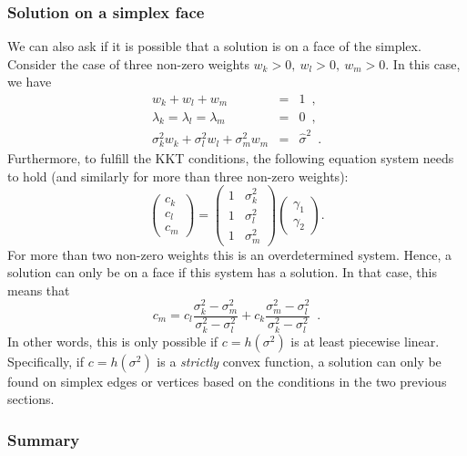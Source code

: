 \documentclass{article}
\numberwithin{equation}{section}
\begin{document}
\subsubsection{Solution on a simplex face}

We can also ask if it is possible that a solution is on a face of the simplex. Consider the case of three non-zero weights $w_k>0,~w_l>0,~w_m>0$. In this case, we have
\begin{eqnarray}
  w_k + w_l + w_m &=& 1\enspace,\\
  \lambda_k = \lambda_l = \lambda_m &=& 0\enspace,\\
  \sigma_k^2 w_k + \sigma_l^2 w_l + \sigma_m^2 w_m &=&\hat{\sigma}^2\enspace.
\end{eqnarray}
Furthermore, to fulfill the KKT conditions, the following equation system needs to hold (and similarly for more than three non-zero weights):
\begin{equation}
  \begin{pmatrix}
    c_k \\
    c_l \\
    c_m
  \end{pmatrix} =
  \begin{pmatrix}
    1 & \sigma_k^2 \\
    1 & \sigma_l^2 \\
    1 & \sigma_m^2 
  \end{pmatrix}
  \begin{pmatrix}
    \gamma_1 \\
    \gamma_2
  \end{pmatrix}.
\end{equation}
For more than two non-zero weights this is an overdetermined system. Hence, a solution can only be on a face if this system has a solution. In that case, this means that
\begin{equation}
  c_m = c_l \frac{\sigma_k^2-\sigma_m^2}{\sigma_k^2-\sigma_l^2} + c_k \frac{\sigma_m^2-\sigma_l^2}{\sigma_k^2-\sigma_l^2}\enspace.
\end{equation}
In other words, this is only possible if $c=h(\sigma^2)$ is at least piecewise linear. Specifically, if $c=h(\sigma^2)$ is a {\it strictly} convex function, a solution can only be found on simplex edges or vertices based on the conditions in the two previous sections.

\subsubsection{Summary}
\label{subsec:lp_summary}
\end{document}
